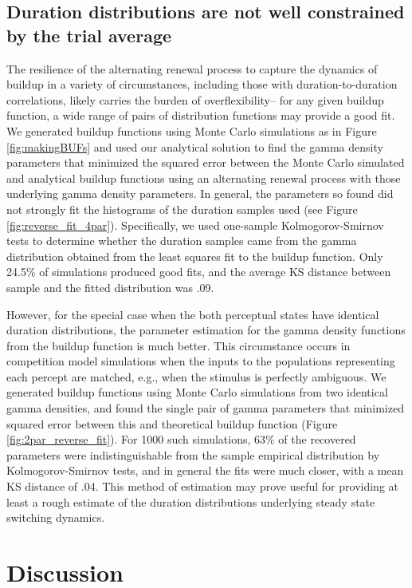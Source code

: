 \documentclass{frontiersSCNS} %
\begin{document}
\subsection{Duration distributions are not well constrained by the trial average}

The resilience of the alternating renewal process to capture the dynamics of buildup in a variety of circumstances, including those with duration-to-duration correlations, likely carries the burden of overflexibility-- for any given buildup function, a wide range of pairs of distribution functions may provide a good fit. We generated buildup functions using Monte Carlo simulations as in Figure \ref{fig:makingBUFs} and used our analytical solution to find the gamma density parameters that minimized the squared error between the Monte Carlo simulated and analytical buildup functions using an alternating renewal process with those underlying gamma density parameters. In general, the parameters so found did not strongly fit the histograms of the duration samples used (see Figure \ref{fig:reverse_fit_4par}).
Specifically, we used one-sample Kolmogorov-Smirnov tests to determine whether the duration samples came from the gamma distribution obtained from the least squares fit to the buildup function. Only 24.5\% of simulations produced good fits, and the average KS distance between sample and the fitted distribution was .09.

However, for the special case when the both perceptual states have identical duration distributions, the parameter estimation for the gamma density functions from the buildup function is much better. This circumstance occurs in competition model simulations when the inputs to the populations representing each percept are matched, e.g., when the stimulus is perfectly ambiguous. We generated buildup functions using Monte Carlo simulations from two identical gamma densities, and found the single pair of gamma parameters that minimized squared error between this and theoretical buildup function (Figure \ref{fig:2par_reverse_fit}). For 1000 such simulations, 63\% of the recovered parameters were indistinguishable from the sample empirical distribution by Kolmogorov-Smirnov tests, and in general the fits were much closer, with a mean KS distance of .04. This method of estimation may prove useful for providing at least a rough estimate of the duration distributions underlying steady state switching dynamics.

\section{Discussion}
\end{document}
